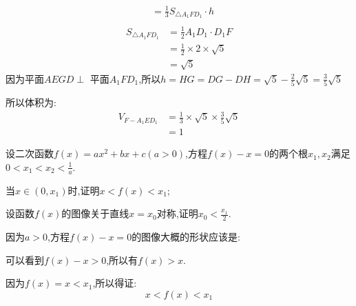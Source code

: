 \documentclass[answers]{exam}
\begin{document}
\begin{questions}
\begin{solution}
\begin{penum}
\begin{align*}
				              & = \frac13S_{\triangle{A_1FD_1}}\cdot h \\
			\end{align*}
			\begin{align*}
				S_{\triangle{A_1FD_1}} & = \frac12A_1D_1\cdot D_1F          \\
				                       & = \frac12 \times 2 \times \sqrt{5} \\
				                       & = \sqrt{5}
			\end{align*}
			因为平面$AEGD \perp$ 平面$A_1FD_1$,所以$h=HG=DG - DH = \sqrt{5} - \frac25{\sqrt{5}} = \frac35\sqrt{5}$

			所以体积为:
			\begin{align*}
				V_{F-A_1ED_1} & = \frac13 \times \sqrt{5} \times \frac35\sqrt{5} \\
				              & = 1
			\end{align*}
		\end{penum}
	\end{solution}

	\question 设二次函数$f(x)=ax^2+bx+c(a>0)$,方程$f(x) - x = 0$的两个根$x_1,x_2$满足$0<x_1<x_2<\frac1a$.
	\begin{penum}
		\item 当$x\in(0,x_1)$时,证明$x<f(x)<x_1$;
		\item 设函数$f(x)$的图像关于直线$x=x_0$对称,证明$x_0<\frac{x_1}{2}$.
	\end{penum}

	\begin{solution}
		\begin{penum}
			\item 因为$a>0$,方程$f(x)-x=0$的图像大概的形状应该是:
			\begin{center}
			\end{center}
			可以看到$f(x) -x > 0$,所以有$f(x) > x$.

			因为$f(x) = x < x_1$,所以得证:
			\begin{equation*}
				x  < f(x) < x_1
			\end{equation*}


\end{penum}
\end{solution}
\end{questions}
\end{document}
